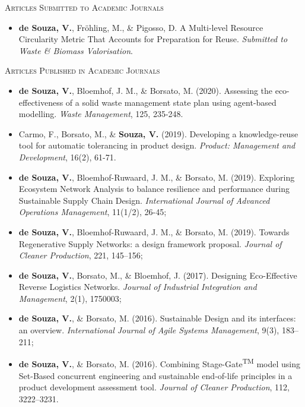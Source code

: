 \faBook
\vspace{5pt}

\textsc{Articles Submitted to Academic Journals}

	{\begin{itemize}
        \item \textbf{de Souza, V.}, Fröhling, M., \& Pigosso, D. A Multi-level Resource Circularity Metric That Accounts for Preparation for Reuse. \textit{Submitted to Waste \& Biomass Valorisation}.
    \end{itemize}}

\textsc{Articles Published in Academic Journals}

	{\begin{itemize}
        \item \textbf{de Souza, V.}, Bloemhof, J. M., \& Borsato, M. (2020). Assessing the eco-effectiveness of a solid waste management state plan using agent-based modelling. \textit{Waste Management}, 125, 235-248.
	    \item Carmo, F., Borsato, M., \& \textbf{Souza, V.} (2019). Developing a knowledge-reuse tool for automatic tolerancing in product design. \textit{Product: Management and Development}, 16(2), 61-71.
	    \item \textbf{de Souza, V.}, Bloemhof-Ruwaard, J. M., \& Borsato, M. (2019). Exploring Ecosystem Network Analysis to balance resilience and performance during Sustainable Supply Chain Design. \textit{International Journal of Advanced Operations Management}, 11(1/2), 26-45;
	    \item \textbf{de Souza, V.}, Bloemhof-Ruwaard, J. M., \& Borsato, M. (2019). Towards Regenerative Supply Networks: a design framework proposal. \textit{Journal of Cleaner Production}, 221, 145–156;
        \item \textbf{de Souza, V.}, Borsato, M., \& Bloemhof, J. (2017). Designing Eco-Effective Reverse Logistics Networks. \textit{Journal of Industrial Integration and Management}, 2(1), 1750003;
        \item \textbf{de Souza, V.}, \& Borsato, M. (2016). Sustainable Design and its interfaces: an overview. \textit{International Journal of Agile Systems Management}, 9(3), 183–211;
        \item \textbf{de Souza, V.}, \& Borsato, M. (2016). Combining Stage-Gate\textsuperscript{TM} model using Set-Based concurrent engineering and sustainable end-of-life principles in a product development assessment tool. \textit{Journal of Cleaner Production}, 112, 3222–3231.
    \end{itemize}}

